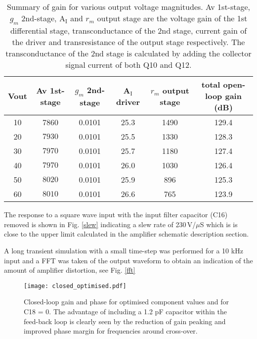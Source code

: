 \documentclass[a4paper,10pt, oneside]{article}
\begin{document}
\begin{table}
\begin{centering}
\begin{tabular}{|c|c|c|c|c|c|}
	\hline
	Vout & Av 1st-stage & $g_{m}$ 2nd-stage & A$_{\textrm{I}}$ driver & $r_{m}$ output stage  & total open-loop gain (dB)\\ [0.3ex] 
	\hline\hline 10 & 7860 & 0.0101 &25.3& 1490 & 129.4\\ 
	\hline 20 & $7930$ & 0.0101 &25.5& 1330 & 128.3\\ 
	\hline 30 & $7970$ & 0.0101 &25.7& 1180 & 127.4\\ 
	\hline 40 & $7970$ & 0.0101 &26.0& 1030 & 126.4\\ 
	\hline 50 & $8020$ & 0.0101 &25.9& 896 & 125.3\\ 
	\hline 60 & $8010$ & 0.0101 &26.6& 765 & 123.9\\ 
	\hline 
\end{tabular}
\caption{Summary of gain for various output voltage magnitudes. Av 1st-stage, $g_{m}$ 2nd-stage, A$_{\textrm{I}}$ and $r_{m}$ output stage are the voltage gain of the 1st differential stage, transconductance of the 2nd stage, current gain of the driver and transresistance of the output stage respectively. The transconductance of the 2nd stage is calculated by adding the collector signal current of both Q10 and Q12.}
\label{table:2}	
\end{centering}
\end{table}
The response to a square wave input with the input filter capacitor (C16) removed is shown in Fig. \ref{slew} indicating a slew rate of 230\,V/$\mu$S which is is close to the upper limit calculated in the amplifier schematic description section. 

A long transient simulation with a small time-step was performed for a 10 kHz input and a FFT was taken of the output waveform to obtain an indication of the amount of amplifier distortion, see Fig. \ref{fft}

\begin{figure}[H]
\begin{centering}
  \texttt{[image: closed\_optimised.pdf]}
  \caption{Closed-loop gain and phase for optimised component values and for C18 = 0. The advantage of 
  	including a 1.2 pF capacitor within the feed-back loop is clearly seen by the reduction of gain peaking and 
  	improved phase margin for frequencies around cross-over.}\label{closed}
\end{centering}
\end{figure}
\end{document}
